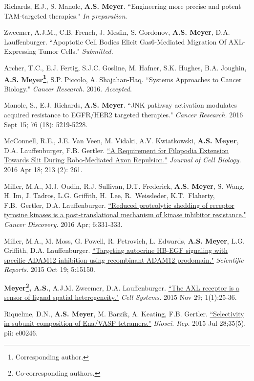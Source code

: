 \documentclass[11pt]{res}
\begin{document}
\begin{resume}
{Richards, E.J., S. Manole, {\bf A.S. Meyer}. ``Engineering more precise and potent TAM-targeted therapies." {\sl In preparation}.

\parskip 0.1in

Zweemer, A.J.M., C.B. French, J. Mesfin, S. Gordonov, {\bf A.S. Meyer\footnotemark[1]}, D.A. Lauffenburger. ``Apoptotic Cell Bodies Elicit Gas6-Mediated Migration Of AXL-Expressing Tumor Cells." {\sl Submitted.}

Archer, T.C., E.J. Fertig, S.J.C. Gosline, M. Hafner, S.K. Hughes, B.A. Joughin, {\bf A.S. Meyer\footnote{Corresponding author.}}, S.P. Piccolo, A. Shajahan-Haq. ``Systems Approaches to Cancer Biology." {\sl Cancer Research.} 2016. {\sl Accepted}.

Manole, S., E.J. Richards, {\bf A.S. Meyer}. ``JNK pathway activation modulates acquired resistance to EGFR/HER2 targeted therapies." {\sl Cancer Research.} 2016 Sept 15; 76 (18): 5219-5228.

McConnell, R.E., J.E. Van Veen, M. Vidaki, A.V. Kwiatkowski, {\bf A.S. Meyer}, D.A. Lauffenburger, F.B. Gertler. \href{http://jcb.rupress.org/content/213/2/261.full}{``A Requirement for Filopodia Extension Towards Slit During Robo-Mediated Axon Repulsion."} {\sl Journal of Cell Biology.} 2016 Apr 18; 213 (2): 261.

Miller, M.A., M.J. Oudin, R.J. Sullivan, D.T. Frederick, {\bf A.S. Meyer}, S. Wang, H. Im, J. Tadros, L.G. Griffith, H. Lee, R. Weissleder, K.T. Flaherty, F.B. Gertler, D.A. Lauffenburger. \href{http://cancerdiscovery.aacrjournals.org/content/early/2016/03/15/2159-8290.CD-15-0933}{``Reduced proteolytic shedding of receptor tyrosine kinases is a post-translational mechanism of kinase inhibitor resistance."} {\sl Cancer Discovery.}  2016 Apr; 6:331-333.

Miller, M.A., M. Moss, G. Powell, R. Petrovich, L. Edwards, {\bf A.S. Meyer}, L.G. Griffith, D.A. Lauffenburger. \href{http://www.ncbi.nlm.nih.gov/pubmed/26477568}{``Targeting autocrine HB-EGF signaling with specific ADAM12 inhibition using recombinant ADAM12 prodomain."} {\sl Scientific Reports.} 2015 Oct 19; 5:15150.

{\bf Meyer\footnote{Co-corresponding authors.}, A.S.}, A.J.M. Zweemer, D.A. Lauffenburger\footnotemark[\value{footnote}]. \href{http://www.cell.com/cell-systems/abstract/S2405-4712(15)00007-1}{``The AXL receptor is a sensor of ligand spatial heterogeneity."} {\sl Cell Systems.} 2015 Nov 29; 1(1):25-36.

Riquelme, D.N., {\bf A.S. Meyer}, M. Barzik, A. Keating, F.B. Gertler. \href{http://www.ncbi.nlm.nih.gov/pubmed/26221026}{``Selectivity in subunit composition of Ena/VASP tetramers."} {\sl Biosci. Rep.} 2015 Jul 28;35(5). pii: e00246.

}
\end{resume}
\end{document}
